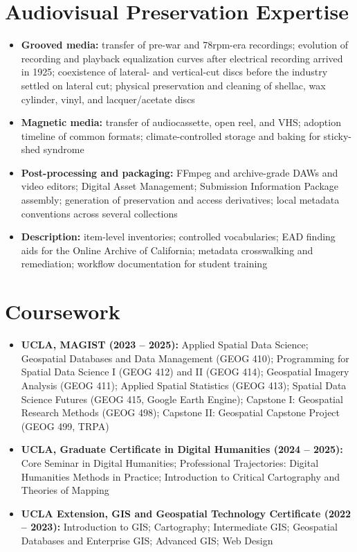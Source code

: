 \documentclass[letterpaper,10pt]{article}
\newlength{\bulletgap}  \setlength{\bulletgap}{0pt}  %
\newlength{\groupindent}\setlength{\groupindent}{0.15in} %
\newcommand{\resumeItem}[1]{\item \small{#1}}
\newif\ifresumecont \resumecontfalse
\newcommand{\resumeItemListStart}{%
  \begin{itemize}[leftmargin=\groupindent, itemsep=\bulletgap,
                  parsep=0pt, topsep=1pt, partopsep=0pt]}
\newcommand{\resumeItemListEnd}{\resumecontfalse\end{itemize}}
\begin{document}
\section{Audiovisual Preservation Expertise}
    \resumeItemListStart
      \resumeItem{\textbf{Grooved media:} transfer of pre-war and 78rpm-era recordings; evolution of recording and playback equalization curves after electrical recording arrived in 1925; coexistence of lateral- and vertical-cut discs before the industry settled on lateral cut; physical preservation and cleaning of shellac, wax cylinder, vinyl, and lacquer/acetate discs}
      \resumeItem{\textbf{Magnetic media:} transfer of audiocassette, open reel, and VHS; adoption timeline of common formats; climate-controlled storage and baking for sticky-shed syndrome}
      \resumeItem{\textbf{Post-processing and packaging:} FFmpeg and archive-grade DAWs and video editors; Digital Asset Management; Submission Information Package assembly; generation of preservation and access derivatives; local metadata conventions across several collections}
      \resumeItem{\textbf{Description:} item-level inventories; controlled vocabularies; EAD finding aids for the Online Archive of California; metadata crosswalking and remediation; workflow documentation for student training}
    \resumeItemListEnd



\section{Coursework}
    \resumeItemListStart
      \resumeItem{\textbf{UCLA, MAGIST (2023 -- 2025):} Applied Spatial Data Science; Geospatial Databases and Data Management (GEOG 410); Programming for Spatial Data Science I (GEOG 412) and II (GEOG 414); Geospatial Imagery Analysis (GEOG 411); Applied Spatial Statistics (GEOG 413); Spatial Data Science Futures (GEOG 415, Google Earth Engine); Capstone I: Geospatial Research Methods (GEOG 498); Capstone II: Geospatial Capstone Project (GEOG 499, TRPA)}
      \resumeItem{\textbf{UCLA, Graduate Certificate in Digital Humanities (2024 -- 2025):} Core Seminar in Digital Humanities; Professional Trajectories: Digital Humanities Methods in Practice; Introduction to Critical Cartography and Theories of Mapping}
      \resumeItem{\textbf{UCLA Extension, GIS and Geospatial Technology Certificate (2022 -- 2023):} Introduction to GIS; Cartography; Intermediate GIS; Geospatial Databases and Enterprise GIS; Advanced GIS; Web Design}
    \resumeItemListEnd
\end{document}
